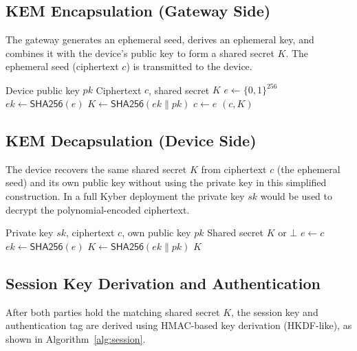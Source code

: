\documentclass[conference]{IEEEtran}
\begin{document}
\subsection{KEM Encapsulation (Gateway Side)}

The gateway generates an ephemeral seed, derives an ephemeral key, and combines it with
the device's public key to form a shared secret $K$. The ephemeral seed (ciphertext
$c$) is transmitted to the device.

\begin{algorithm}[!t]
\caption{KEM Encapsulation}\label{alg:encaps}
\begin{algorithmic}[1]
\REQUIRE Device public key $pk$
\ENSURE Ciphertext $c$, shared secret $K$
\STATE $e    \leftarrow \{0,1\}^{256}$ \quad {}
\STATE $ek   \leftarrow \textsf{SHA256}(e)$
\STATE $K    \leftarrow \textsf{SHA256}(ek \| pk)$
\STATE $c    \leftarrow e$                   
\RETURN $(c, K)$
\end{algorithmic}
\end{algorithm}

\subsection{KEM Decapsulation (Device Side)}

The device recovers the same shared secret $K$ from ciphertext $c$ (the ephemeral
seed) and its own public key without using the private key in this simplified
construction. In a full Kyber deployment the private key $sk$ would be used to decrypt
the polynomial-encoded ciphertext.

\begin{algorithm}[!t]
\caption{KEM Decapsulation}\label{alg:decaps}
\begin{algorithmic}[1]
\REQUIRE Private key $sk$, ciphertext $c$, own public key $pk$
\ENSURE Shared secret $K$ or $\bot$
\STATE $e   \leftarrow c$
\STATE $ek  \leftarrow \textsf{SHA256}(e)$
\STATE $K   \leftarrow \textsf{SHA256}(ek \| pk)$
\RETURN $K$
\end{algorithmic}
\end{algorithm}

\subsection{Session Key Derivation and Authentication}

After both parties hold the matching shared secret $K$, the session key and
authentication tag are derived using HMAC-based key derivation (HKDF-like), as shown
in Algorithm~\ref{alg:session}.
\end{document}
